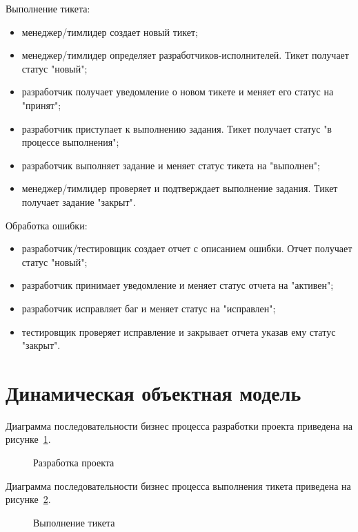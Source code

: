 Выполнение тикета:
\begin{itemize}
\item менеджер/тимлидер создает новый тикет;
\item менеджер/тимлидер определяет разработчиков-исполнителей. Тикет получает статус "новый";
\item разработчик получает уведомление о новом тикете и меняет его статус на "принят";
\item разработчик приступает к выполнению задания. Тикет получает статус "в процессе выполнения";
\item разработчик выполняет задание и меняет статус тикета на "выполнен";
\item менеджер/тимлидер проверяет и подтверждает выполнение задания. Тикет получает задание "закрыт".
\end{itemize}

Обработка ошибки:
\begin{itemize}
\item разработчик/тестировщик создает отчет с описанием ошибки. Отчет получает статус "новый";
\item разработчик принимает уведомление и меняет статус отчета на "активен";
\item разработчик исправляет баг и меняет статус на "исправлен";
\item тестировщик проверяет исправление и закрывает отчета указав ему статус "закрыт".
\end{itemize}

\section{Динамическая объектная модель}
Диаграмма последовательности бизнес процесса разработки проекта приведена на рисунке~\ref{fig:sequenceProject}.
\begin{figure}[h]
\caption{Разработка проекта}
\label{fig:sequenceProject}
\end{figure}

Диаграмма последовательности бизнес процесса выполнения тикета приведена на рисунке~\ref{fig:sequenceTicket}.
\begin{figure}[h]
\caption{Выполнение тикета}
\label{fig:sequenceTicket}
\end{figure}


